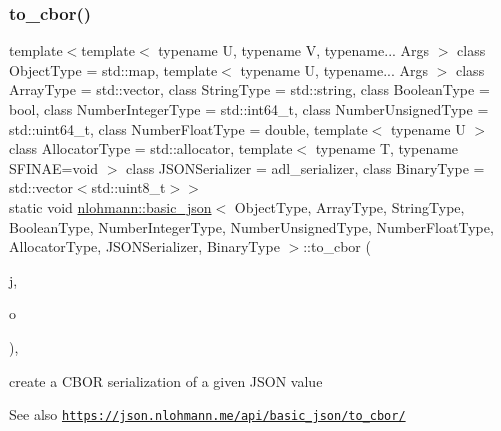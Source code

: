 \subsubsection{\texorpdfstring{to\+\_\+cbor()}{to\_cbor()}\hspace{0.1cm}{\footnotesize\ttfamily [2/3]}}
{\footnotesize\ttfamily template$<$template$<$ typename U, typename V, typename... Args $>$ class Object\+Type = std\+::map, template$<$ typename U, typename... Args $>$ class Array\+Type = std\+::vector, class String\+Type  = std\+::string, class Boolean\+Type  = bool, class Number\+Integer\+Type  = std\+::int64\+\_\+t, class Number\+Unsigned\+Type  = std\+::uint64\+\_\+t, class Number\+Float\+Type  = double, template$<$ typename U $>$ class Allocator\+Type = std\+::allocator, template$<$ typename T, typename S\+F\+I\+N\+A\+E=void $>$ class J\+S\+O\+N\+Serializer = adl\+\_\+serializer, class Binary\+Type  = std\+::vector$<$std\+::uint8\+\_\+t$>$$>$ \\
static void \hyperlink{classnlohmann_1_1basic__json}{nlohmann\+::basic\+\_\+json}$<$ Object\+Type, Array\+Type, String\+Type, Boolean\+Type, Number\+Integer\+Type, Number\+Unsigned\+Type, Number\+Float\+Type, Allocator\+Type, J\+S\+O\+N\+Serializer, Binary\+Type $>$\+::to\+\_\+cbor (\begin{DoxyParamCaption}\item[{const \hyperlink{classnlohmann_1_1basic__json}{basic\+\_\+json}$<$ Object\+Type, Array\+Type, String\+Type, Boolean\+Type, Number\+Integer\+Type, Number\+Unsigned\+Type, Number\+Float\+Type, Allocator\+Type, J\+S\+O\+N\+Serializer, Binary\+Type $>$ \&}]{j,  }\item[{\hyperlink{classnlohmann_1_1detail_1_1output__adapter}{detail\+::output\+\_\+adapter}$<$ std\+::uint8\+\_\+t $>$}]{o }\end{DoxyParamCaption})\hspace{0.3cm}{\ttfamily [inline]}, {\ttfamily [static]}}



create a C\+B\+OR serialization of a given J\+S\+ON value 

\begin{DoxySeeAlso}{See also}
\href{https://json.nlohmann.me/api/basic_json/to_cbor/}{\tt https\+://json.\+nlohmann.\+me/api/basic\+\_\+json/to\+\_\+cbor/} 
\end{DoxySeeAlso}
\mbox{\label{classnlohmann_1_1basic__json_a5689672954fd3bc38f2f17e5607064c6}} 
